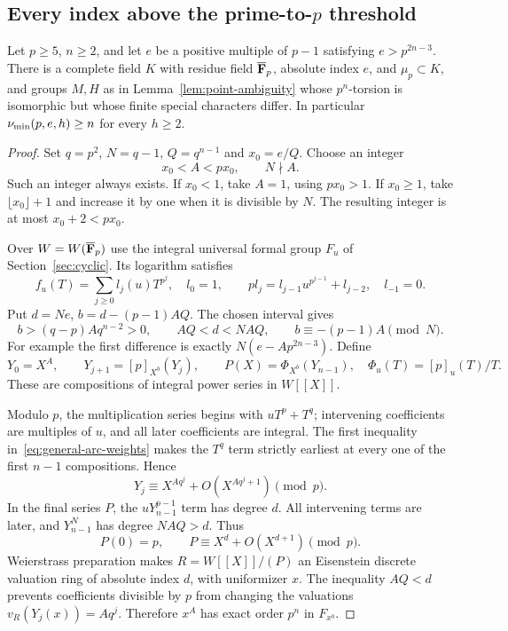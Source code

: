 \subsection{Every index above the prime-to-$p$ threshold}
\begin{theorem}\label{thm:general-arc}
Let $p\ge5$, $n\ge2$, and let $e$ be a positive multiple of $p-1$ satisfying $e>p^{2n-3}$. There is a complete field $K$ with residue field $\overline{\mathbf F}_p$, absolute index $e$, and $\mu_p\subset K$, and groups $M,H$ as in Lemma~\ref{lem:point-ambiguity} whose $p^n$-torsion is isomorphic but whose finite special characters differ. In particular $\nu_{\min}(p,e,h)\ge n$ for every $h\ge2$.
\end{theorem}
\begin{proof}
Set $q=p^2$, $N=q-1$, $Q=q^{n-1}$ and $x_0=e/Q$. Choose an integer
\[
                          x_0<A<px_0,\qquad N\nmid A.
\]
Such an integer always exists. If $x_0<1$, take $A=1$, using $px_0>1$. If $x_0\ge1$, take $\lfloor x_0\rfloor+1$ and increase it by one when it is divisible by $N$. The resulting integer is at most $x_0+2<px_0$.

Over $W=W(\overline{\mathbf F}_p)$ use the integral universal formal group $F_u$ of Section~\ref{sec:cyclic}. Its logarithm satisfies
\begin{equation}\label{eq:homogeneous-logarithm}
 f_u(T)=\sum_{j\ge0}l_j(u)T^{p^j},\quad l_0=1,
 \qquad pl_j=l_{j-1}u^{p^{j-1}}+l_{j-2},\quad l_{-1}=0.
\end{equation}
Put $d=Ne$, $b=d-(p-1)AQ$. The chosen interval gives
\begin{equation}\label{eq:general-arc-weights}
 b>(q-p)Aq^{n-2}>0,\qquad AQ<d<NAQ,
                 \qquad b\equiv-(p-1)A\pmod N.
\end{equation}
For example the first difference is exactly $N(e-Ap^{2n-3})$.
Define
\[
 Y_0=X^A,\qquad Y_{j+1}=[p]_{X^b}(Y_j),\qquad
 P(X)=\Phi_{X^b}(Y_{n-1}),\quad \Phi_u(T)=[p]_u(T)/T.
\]
These are compositions of integral power series in $W[[X]]$.

Modulo $p$, the multiplication series begins with $uT^p+T^q$; intervening coefficients are multiples of $u$, and all later coefficients are integral. The first inequality in~\eqref{eq:general-arc-weights} makes the $T^q$ term strictly earliest at every one of the first $n-1$ compositions. Hence
\[
                        Y_j\equiv X^{Aq^j}+O(X^{Aq^j+1})\pmod p.
\]
In the final series $P$, the $uY_{n-1}^{p-1}$ term has degree $d$. All intervening terms are later, and $Y_{n-1}^N$ has degree $NAQ>d$. Thus
\[
                         P(0)=p,\qquad P\equiv X^d+O(X^{d+1})\pmod p.
\]
Weierstrass preparation makes $R=W[[X]]/(P)$ an Eisenstein discrete valuation ring of absolute index $d$, with uniformizer $x$. The inequality $AQ<d$ prevents coefficients divisible by $p$ from changing the valuations $v_R(Y_j(x))=Aq^j$. Therefore $x^A$ has exact order $p^n$ in $F_{x^b}$.


\end{proof}
